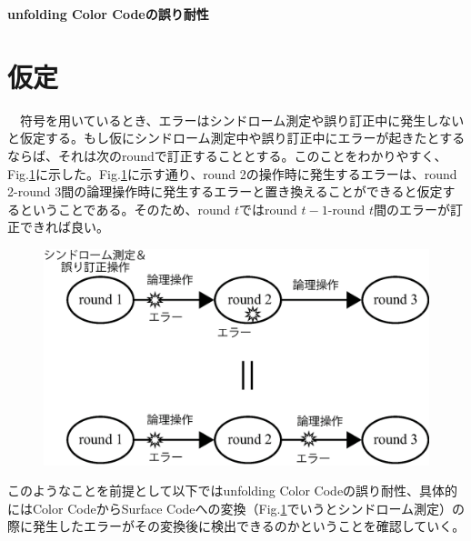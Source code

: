 \documentclass[a4paper,9pt]{ltjsarticle}
\begin{document}
\centerline{\Large\bfseries unfolding Color Codeの誤り耐性}
\vspace{10pt}
\section{仮定}{
    　符号を用いているとき、エラーはシンドローム測定や誤り訂正中に発生しないと仮定する。もし仮にシンドローム測定中や誤り訂正中にエラーが起きたとするならば、それは次のroundで訂正することとする。このことをわかりやすく、Fig.\ref{figure1}に示した。Fig.\ref{figure1}に示す通り、round 2の操作時に発生するエラーは、round 2-round 3間の論理操作時に発生するエラーと置き換えることができると仮定するということである。そのため、round $t$ではround $t-1$-round $t$間のエラーが訂正できれば良い。
    \begin{figure}[h]
        \centering
        \includegraphics[scale=0.5]{figure/figure1.eps}
        \caption{ }
        \label{figure1}
    \end{figure}

    このようなことを前提として以下ではunfolding Color Codeの誤り耐性、具体的にはColor CodeからSurface Codeへの変換（Fig.\ref{figure1}でいうとシンドローム測定）の際に発生したエラーがその変換後に検出できるのかということを確認していく。\\
}
\end{document}
